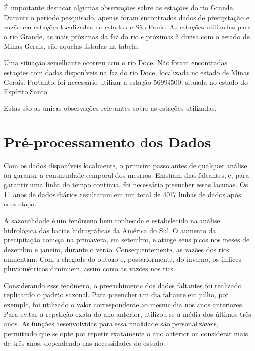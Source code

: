 É importante destacar algumas observações sobre as estações do rio Grande. Durante o período pesquisado, apenas foram encontrados dados de precipitação e vazão em estações localizadas no estado de São Paulo. As estações utilizadas para o rio Grande, as mais próximas da foz do rio e próximas à divisa com o estado de Minas Gerais, são aquelas listadas na tabela.

Uma situação semelhante ocorreu com o rio Doce. Não foram encontradas estações com dados disponíveis na foz do rio Doce, localizada no estado de Minas Gerais. Portanto, foi necessário utilizar a estação 56994500, situada no estado do Espírito Santo.

Estas são as únicas observações relevantes sobre as estações utilizadas.

\section{Pré-processamento dos Dados}

Com os dados disponíveis localmente, o primeiro passo antes de qualquer análise foi garantir a continuidade temporal dos mesmos. Existiam dias faltantes, e, para garantir uma linha do tempo contínua, foi necessário preencher essas lacunas. Os 11 anos de dados diários resultaram em um total de 4017 linhas de dados após essa etapa.

A sazonalidade é um fenômeno bem conhecido e estabelecido na análise hidrológica das bacias hidrográficas da América do Sul. O aumento da precipitação começa na primavera, em setembro, e atinge seus picos nos meses de dezembro e janeiro, durante o verão. Consequentemente, as vazões dos rios aumentam. Com a chegada do outono e, posteriormente, do inverno, os índices pluviométricos diminuem, assim como as vazões nos rios. \cite{rayyan-39677094}

Considerando esse fenômeno, o preenchimento dos dados faltantes foi realizado replicando o padrão sazonal. Para preencher um dia faltante em julho, por exemplo, foi utilizado o valor correspondente ao mesmo dia nos anos anteriores. Para evitar a repetição exata do ano anterior, utilizou-se a média dos últimos três anos. As funções desenvolvidas para essa finalidade são personalizáveis, permitindo que se opte por repetir exatamente o ano anterior ou considerar mais de três anos, dependendo das necessidades do estudo.

